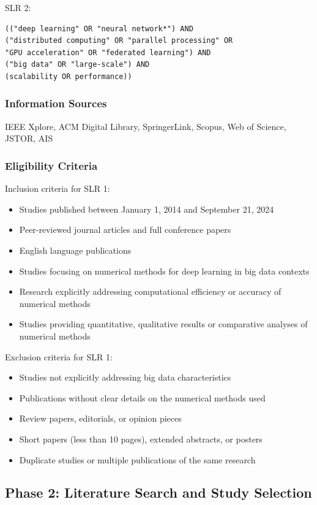 \documentclass[a4paper,12pt]{article}
\begin{document}
\vline

SLR 2:
\begin{verbatim}
(("deep learning" OR "neural network*") AND 
("distributed computing" OR "parallel processing" OR 
"GPU acceleration" OR "federated learning") AND 
("big data" OR "large-scale") AND 
(scalability OR performance))
\end{verbatim}

\subsubsection{Information Sources}
IEEE Xplore, ACM Digital Library, SpringerLink, Scopus, Web of Science, JSTOR, AIS 

\subsubsection{Eligibility Criteria}
Inclusion criteria for SLR 1:
\begin{itemize}
    \item Studies published between January 1, 2014 and September 21, 2024
    \item Peer-reviewed journal articles and full conference papers
    \item English language publications
    \item Studies focusing on numerical methods for deep learning in big data contexts
    \item Research explicitly addressing computational efficiency or accuracy of numerical methods
    \item Studies providing quantitative, qualitative results or comparative analyses of numerical methods
\end{itemize}

Exclusion criteria for SLR 1:
\begin{itemize}
    \item Studies not explicitly addressing big data characteristics
    \item Publications without clear details on the numerical methods used
    \item Review papers, editorials, or opinion pieces
    \item Short papers (less than 10 pages), extended abstracts, or posters
    \item Duplicate studies or multiple publications of the same research
\end{itemize}
\subsection{Phase 2: Literature Search and Study Selection}
\end{document}
